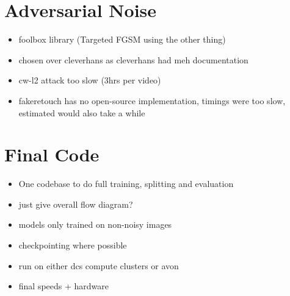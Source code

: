 \section{Adversarial Noise}

\begin{itemize}
    \item foolbox library (Targeted FGSM using the other thing)
    \item chosen over cleverhans as cleverhans had meh documentation
    \item cw-l2 attack too slow (3hrs per video)
    \item fakeretouch has no open-source implementation, timings were too slow, estimated would also take a while
\end{itemize}

\section{Final Code}

\begin{itemize}
    \item One codebase to do full training, splitting and evaluation
    \item just give overall flow diagram?
    \item {\huge models only trained on non-noisy images}
    \item checkpointing where possible
    \item run on either dcs compute clusters or avon
    \item final speeds + hardware
\end{itemize}